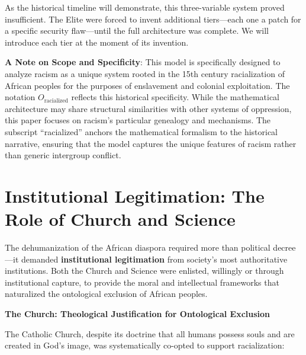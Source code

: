 \documentclass[12pt,openany]{book}
\begin{document}
As the historical timeline will demonstrate, this three-variable system proved insufficient. The Elite were forced to invent additional tiers---each one a patch for a specific security flaw---until the full architecture was complete. We will introduce each tier at the moment of its invention.

\textbf{A Note on Scope and Specificity}: This model is specifically designed to analyze racism as a unique system rooted in the 15th century racialization of African peoples for the purposes of enslavement and colonial exploitation. The notation $O_{\text{racialized}}$ reflects this historical specificity. While the mathematical architecture may share structural similarities with other systems of oppression, this paper focuses on racism's particular genealogy and mechanisms. The subscript ``racialized'' anchors the mathematical formalism to the historical narrative, ensuring that the model captures the unique features of racism rather than generic intergroup conflict.

\section{Institutional Legitimation: The Role of Church and Science}

The dehumanization of the African diaspora required more than political decree---it demanded \textbf{institutional legitimation} from society's most authoritative institutions. Both the Church and Science were enlisted, willingly or through institutional capture, to provide the moral and intellectual frameworks that naturalized the ontological exclusion of African peoples.

\textbf{The Church: Theological Justification for Ontological Exclusion}

The Catholic Church, despite its doctrine that all humans possess souls and are created in God's image, was systematically co-opted to support racialization:
\end{document}
